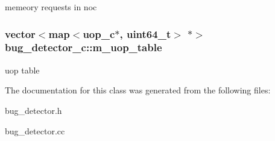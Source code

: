 \label{classbug__detector__c_a650c89720f96ea9c79230e7341b88885}
memeory requests in noc \hypertarget{classbug__detector__c_a0b23d445e54499579a1126223c119948}{
\subsubsection[{m\_\-uop\_\-table}]{\setlength{\rightskip}{0pt plus 5cm}vector$<$map$<${\bf uop\_\-c}$\ast$, uint64\_\-t$>$ $\ast$$>$ {\bf bug\_\-detector\_\-c::m\_\-uop\_\-table}}}
\label{classbug__detector__c_a0b23d445e54499579a1126223c119948}
uop table 

The documentation for this class was generated from the following files:\begin{DoxyCompactItemize}
\item 
bug\_\-detector.h\item 
bug\_\-detector.cc\end{DoxyCompactItemize}
